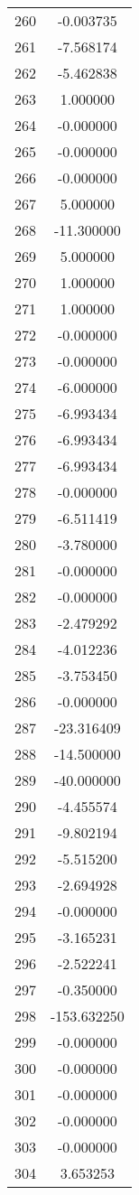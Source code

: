 \documentclass[12pt]{article}
\begin{document}
\begin{longtable}{@{}cc@{}}
260 & -0.003735 \\
261 & -7.568174 \\
262 & -5.462838 \\
263 & 1.000000 \\
264 & -0.000000 \\
265 & -0.000000 \\
266 & -0.000000 \\
267 & 5.000000 \\
268 & -11.300000 \\
269 & 5.000000 \\
270 & 1.000000 \\
271 & 1.000000 \\
272 & -0.000000 \\
273 & -0.000000 \\
274 & -6.000000 \\
275 & -6.993434 \\
276 & -6.993434 \\
277 & -6.993434 \\
278 & -0.000000 \\
279 & -6.511419 \\
280 & -3.780000 \\
281 & -0.000000 \\
282 & -0.000000 \\
283 & -2.479292 \\
284 & -4.012236 \\
285 & -3.753450 \\
286 & -0.000000 \\
287 & -23.316409 \\
288 & -14.500000 \\
289 & -40.000000 \\
290 & -4.455574 \\
291 & -9.802194 \\
292 & -5.515200 \\
293 & -2.694928 \\
294 & -0.000000 \\
295 & -3.165231 \\
296 & -2.522241 \\
297 & -0.350000 \\
298 & -153.632250 \\
299 & -0.000000 \\
300 & -0.000000 \\
301 & -0.000000 \\
302 & -0.000000 \\
303 & -0.000000 \\
304 & 3.653253 \\

\end{longtable}
\end{document}
